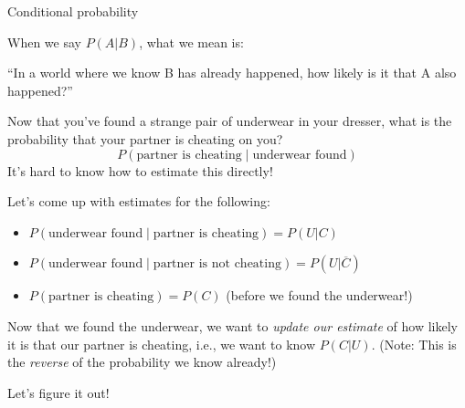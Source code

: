 \documentclass{beamer}\usepackage[]{graphicx}\usepackage[]{color}
\begin{document}
\begin{darkframes}
\begin{frame}{Conditional probability}
  \begin{center}
    When we say $P(A|B)$, what we mean is:
    \bigskip

    ``In a world where we know B has already happened, how likely is it that A also happened?''
  \end{center}
\end{frame}

\begin{frame}
\end{frame}

\begin{frame}
\end{frame}

\begin{frame}
  \begin{center}
    Now that you’ve found a strange pair of underwear in your dresser, what is the probability that your partner is cheating on you?
    \bigskip
    \[ P(\text{partner is cheating} \mid \text{underwear found}) \]
    \pause\bigskip
    It's hard to know how to estimate this directly!
  \end{center}
\end{frame}

\begin{frame}
  Let's come up with estimates for the following:
  \begin{itemize}[<+->]
    \item $P(\text{underwear found} \mid \text{partner is cheating}) = P(U|C)$
    \item $P(\text{underwear found} \mid \text{partner is not cheating}) = P(U|\overline C)$
    \item $P(\text{partner is cheating}) = P(C)$ (before we found the underwear!)
  \end{itemize}
  Now that we found the underwear, we want to \emph{update our estimate} of how likely it is that our partner is cheating, i.e., we want to know $P(C|U)$.
  \newline\pause
  (Note: This is the \emph{reverse} of the probability we know already!)
\end{frame}

\begin{frame}{Let's figure it out!}


\end{frame}
\end{darkframes}
\end{document}
